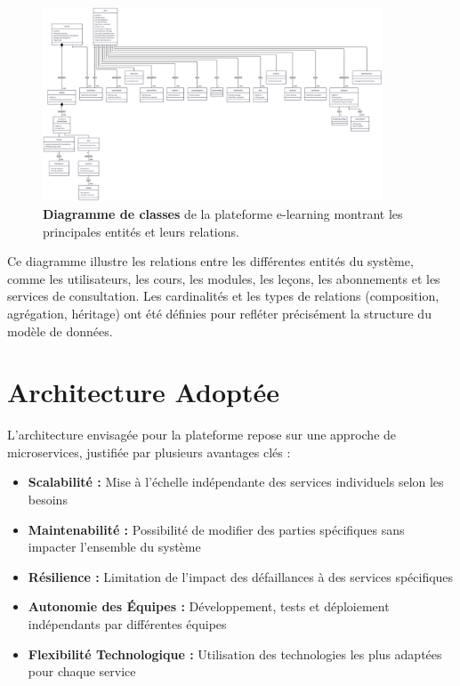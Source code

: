 \begin{figure}[H]
  \centering
  \includegraphics[width=0.9\textwidth,keepaspectratio]{week_1_img/class_diagrame.png}
  \caption{\textbf{Diagramme de classes} de la plateforme e-learning montrant les principales entités et leurs relations.}
  \label{fig:class_diagram}
\end{figure}

Ce diagramme illustre les relations entre les différentes entités du système, comme les utilisateurs, les cours, les modules, les leçons, les abonnements et les services de consultation. Les cardinalités et les types de relations (composition, agrégation, héritage) ont été définies pour refléter précisément la structure du modèle de données.

\section{Architecture Adoptée}

L'architecture envisagée pour la plateforme repose sur une approche de microservices, justifiée par plusieurs avantages clés :
\begin{itemize}
  \item \textbf{Scalabilité :} Mise à l'échelle indépendante des services individuels selon les besoins
  \item \textbf{Maintenabilité :} Possibilité de modifier des parties spécifiques sans impacter l'ensemble du système
  \item \textbf{Résilience :} Limitation de l'impact des défaillances à des services spécifiques
  \item \textbf{Autonomie des Équipes :} Développement, tests et déploiement indépendants par différentes équipes
  \item \textbf{Flexibilité Technologique :} Utilisation des technologies les plus adaptées pour chaque service
\end{itemize}

